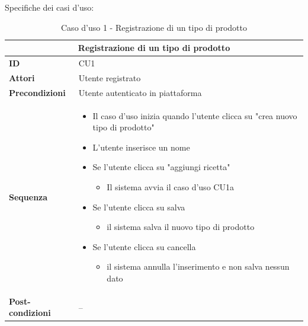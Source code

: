 \documentclass[a4paper,11pt]{article}
\begin{document}
Specifiche dei casi d'uso:

\begin{table}[H]
  \centering
  \begin{tabular}{|m{2cm}|m{10.5cm}|}
    \hline
    \multicolumn{2}{|c|}{\textbf{Registrazione di un tipo di prodotto}}                \\ \hline
    \multicolumn{1}{|l|}{\textbf{ID}}              & CU1                               \\ \hline
    \multicolumn{1}{|l|}{\textbf{Attori}}          & Utente registrato                 \\ \hline
    \multicolumn{1}{|l|}{\textbf{Precondizioni}}   & Utente autenticato in piattaforma \\ \hline
    \multicolumn{1}{|l|}{\textbf{Sequenza}}        &
    \begin{itemize}
      \item Il caso d'uso inizia quando l'utente clicca su "crea nuovo tipo di prodotto"
      \item L'utente inserisce un nome
      \item Se l'utente clicca su "aggiungi ricetta"
            \begin{itemize}
              \item Il sistema avvia il caso d'uso CU1a
            \end{itemize}
      \item Se l'utente clicca su salva
            \begin{itemize}
              \item il sistema salva il nuovo tipo di prodotto
            \end{itemize}
      \item Se l'utente clicca su cancella
            \begin{itemize}
              \item il sistema annulla l'inserimento e non salva nessun dato
            \end{itemize}
    \end{itemize}  \\ \hline
    \multicolumn{1}{|l|}{\textbf{Post-condizioni}} & --                                \\ \hline
  \end{tabular}
  \caption{Caso d'uso 1 - Registrazione di un tipo di prodotto}
  \label{cu:CU1}
\end{table}
\end{document}
